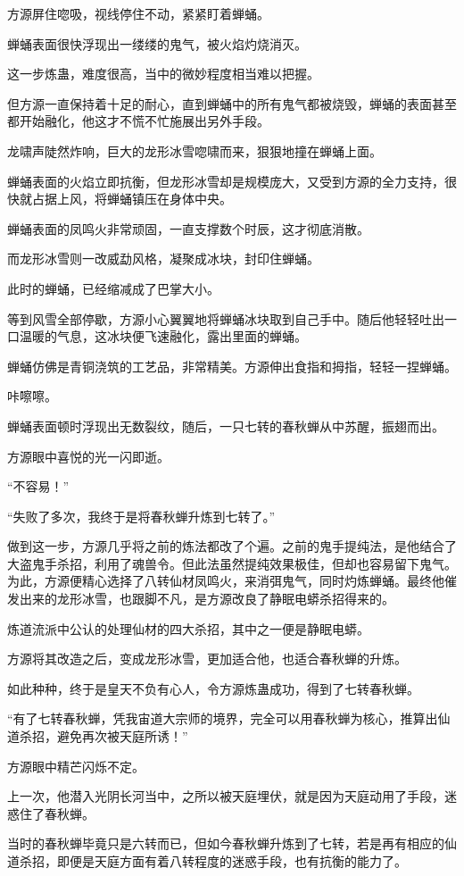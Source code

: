 \begin{this_body}
方源屏住唿吸，视线停住不动，紧紧盯着蝉蛹。

蝉蛹表面很快浮现出一缕缕的鬼气，被火焰灼烧消灭。

这一步炼蛊，难度很高，当中的微妙程度相当难以把握。

但方源一直保持着十足的耐心，直到蝉蛹中的所有鬼气都被烧毁，蝉蛹的表面甚至都开始融化，他这才不慌不忙施展出另外手段。

龙啸声陡然炸响，巨大的龙形冰雪唿啸而来，狠狠地撞在蝉蛹上面。

蝉蛹表面的火焰立即抗衡，但龙形冰雪却是规模庞大，又受到方源的全力支持，很快就占据上风，将蝉蛹镇压在身体中央。

蝉蛹表面的凤鸣火非常顽固，一直支撑数个时辰，这才彻底消散。

而龙形冰雪则一改威勐风格，凝聚成冰块，封印住蝉蛹。

此时的蝉蛹，已经缩减成了巴掌大小。

等到风雪全部停歇，方源小心翼翼地将蝉蛹冰块取到自己手中。随后他轻轻吐出一口温暖的气息，这冰块便飞速融化，露出里面的蝉蛹。

蝉蛹仿佛是青铜浇筑的工艺品，非常精美。方源伸出食指和拇指，轻轻一捏蝉蛹。

咔嚓嚓。

蝉蛹表面顿时浮现出无数裂纹，随后，一只七转的春秋蝉从中苏醒，振翅而出。

方源眼中喜悦的光一闪即逝。

“不容易！”

“失败了多次，我终于是将春秋蝉升炼到七转了。”

做到这一步，方源几乎将之前的炼法都改了个遍。之前的鬼手提纯法，是他结合了大盗鬼手杀招，利用了魂兽令。但此法虽然提纯效果极佳，但却也容易留下鬼气。为此，方源便精心选择了八转仙材凤鸣火，来消弭鬼气，同时灼炼蝉蛹。最终他催发出来的龙形冰雪，也跟脚不凡，是方源改良了静眠电蟒杀招得来的。

炼道流派中公认的处理仙材的四大杀招，其中之一便是静眠电蟒。

方源将其改造之后，变成龙形冰雪，更加适合他，也适合春秋蝉的升炼。

如此种种，终于是皇天不负有心人，令方源炼蛊成功，得到了七转春秋蝉。

“有了七转春秋蝉，凭我宙道大宗师的境界，完全可以用春秋蝉为核心，推算出仙道杀招，避免再次被天庭所诱！”

方源眼中精芒闪烁不定。

上一次，他潜入光阴长河当中，之所以被天庭埋伏，就是因为天庭动用了手段，迷惑住了春秋蝉。

当时的春秋蝉毕竟只是六转而已，但如今春秋蝉升炼到了七转，若是再有相应的仙道杀招，即便是天庭方面有着八转程度的迷惑手段，也有抗衡的能力了。


\end{this_body}

